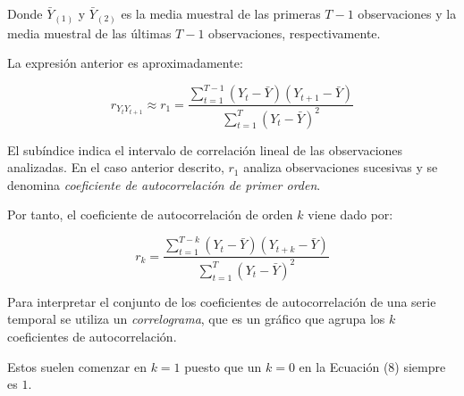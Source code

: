 \documentclass[a4paper,10pt]{article}
\begin{document}
Donde $\bar{Y}_{(1)}$ y $\bar{Y}_{(2)}$ es la media muestral de las primeras $T-1$ observaciones y la media muestral de las últimas $T-1$ observaciones, respectivamente.

La expresión anterior es aproximadamente:

\begin{equation}
 r_{Y_t Y_{t+1}} \approx r_1 = \frac{\sum_{t=1}^{T-1} (Y_t - \bar{Y}) (Y_{t+1} - \bar{Y})}
 {\sum_{t=1}^{T} (Y_t - \bar{Y})^2 }
\end{equation}

El subíndice indica el intervalo de correlación lineal de las observaciones analizadas. En el caso anterior descrito, $r_1$ analiza observaciones sucesivas y se denomina \textit{coeficiente de autocorrelación de primer orden}.

Por tanto, el coeficiente de autocorrelación de orden $k$ viene dado por:

\begin{equation}
 r_k = \frac{\sum_{t=1}^{T-k} (Y_t - \bar{Y}) (Y_{t+k} - \bar{Y})}
 {\sum_{t=1}^{T} (Y_t - \bar{Y})^2 }
\end{equation}

Para interpretar el conjunto de los coeficientes de autocorrelación de una serie temporal se utiliza un \textit{correlograma}, que es un gráfico que agrupa los $k$ coeficientes de autocorrelación.

Estos suelen comenzar en $k=1$ puesto que un $k=0$ en la Ecuación (8) siempre es $1$.
\end{document}
